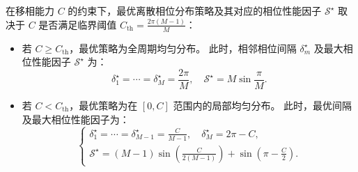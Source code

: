 \begin{theorem}\label{the:ddma_opt_phase}
	在移相能力 $C$ 的约束下，最优离散相位分布策略及其对应的相位性能因子 $\mathcal{S}^\star$ 取决于 $C$ 是否满足临界阈值 $C_{\text{th}} = \frac{2\pi(M-1)}{M}$：
	\begin{itemize}
		\item 若 $C \ge C_{\text{th}}$，最优策略为全周期均匀分布。
		此时，相邻相位间隔 $\delta_m^\star$ 及最大相位性能因子 $\mathcal{S}^\star$ 为：
		\begin{equation}\label{eq:ddma_case_sufficient}
			\delta_1^\star = \cdots =\delta_M^\star = \frac{2\pi}{M}, \quad 
			\mathcal{S}^\star = M \sin \frac{\pi}{M}.
		\end{equation}
		
		\item 若 $C < C_{\text{th}}$，最优策略为在 $[0, C]$ 范围内的局部均匀分布。
		此时，最优间隔及最大相位性能因子为：
		\begin{equation}\label{eq:ddma_case_limited}
			\begin{cases}
				\delta_1^\star = \cdots =\delta_{M-1}^\star = \frac{C}{M-1}, \quad \delta_M^\star = 2\pi - C, \\
				\mathcal{S}^\star = (M-1) \sin \left( \frac{C}{2(M-1)} \right) + \sin \left( \pi - \frac{C}{2} \right).
			\end{cases}
		\end{equation}
	\end{itemize}
\end{theorem}

